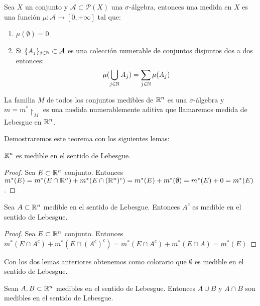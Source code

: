 \begin{definición}
    Sea $X$ un conjunto y $\mathcal{A} \subset \mathcal{P}(X)$ una $\sigma$-álgebra, entonces una medida en $X$ es una función $\mu: \mathcal{A} \to [0, +\infty]$ tal que:
    \begin{enumerate}
        \item $\mu(\emptyset) = 0$
        \item Si $\{A_j\}_{j \in \mathbb{N}} \subset \mathcal{A}$ es una colección numerable de conjuntos disjuntos dos a dos entonces: $$\mu(\bigcup_{j \in \mathbb{N}} A_j) = \sum_{j \in \mathbb{N}} \mu(A_j)$$
    \end{enumerate}
\end{definición}


\begin{teorema}
    La familia $M$ de todos los conjuntos medibles de $\mathbb{R}^n$ es una $\sigma$-álgebra y $m = m^* \restriction_M$ es una medida numerablemente aditiva que llamaremos medida de Lebesgue en $\mathbb{R}^n$.
\end{teorema}

Demostraremos este teorema con los siguientes lemas:

\begin{lema}
    $\mathbb{R}^n$ es medible en el sentido de Lebesgue.
\end{lema}

\begin{proof}
    Sea $E \subset \mathbb{R}^n$ conjunto. Entonces $m^*(E) = m^*(E \cap \mathbb{R}^n) + m^*(E \cap (\mathbb{R}^n)^c) = m^*(E) + m^*(\emptyset) = m^*(E) + 0 = m^*(E)$.
\end{proof}

\begin{lema}
    Sea $A \subset \mathbb{R}^n$ medible en el sentido de Lebesgue. Entonces $A^c$ es medible en el sentido de Lebesgue.
\end{lema}

\begin{proof}
    Sea $E \subset \mathbb{R}^n$ conjunto. Entonces $m^*(E \cap A^c) + m^*(E \cap (A^c)^c) = m^*(E \cap A^c) + m^*(E \cap A) = m^*(E)$
\end{proof}

Con los dos lemas anteriores obtenemos como colorario que $\emptyset$ es medible en el sentido de Lebesgue.

\begin{lema}
    Sean $A, B \subset \mathbb{R}^n$ medibles en el sentido de Lebesgue. Entonces $A \cup B$ y $A \cap B$ son medibles en el sentido de Lebesgue.
\end{lema}

